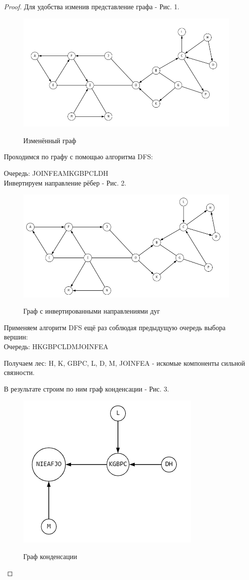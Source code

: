 \begin{proof}
 Для удобства изменив представление графа - Рис. 1.
 
    \begin{figure}[h]
    \centering
     \includegraphics[width=0.7\linewidth]{pics/8thGraphSol.png}
     \label{fig:dm}
     \caption{Изменённый граф}
    \end{figure}
 
 Проходимся по графу с помощью алгоритма DFS:
 
 Очередь: JOINFEAMKGBPCLDH\\

 Инвертируем направление рёбер - Рис. 2.

 \begin{figure}[h]
    \centering
     \includegraphics[width=0.7\linewidth]{pics/8thInverGraph.png}
     \label{fig:dm}
     \caption{Граф с инвертированными направлениями дуг}
    \end{figure}
 
 Применяем алгоритм DFS ещё раз соблюдая предыдущую очередь выбора вершин:\\
 
 Очередь: HKGBPCLDMJOINFEA

 Получаем лес: H, K, GBPC, L, D, M, JOINFEA - искомые компоненты сильной связности.
 
 В результате строим по ним граф конденсации - Рис. 3.

 \begin{figure}[h]
    \centering
     \includegraphics[width=0.3\linewidth]{pics/8thCondensGraph.png}
     \label{fig:dm}
     \caption{Граф конденсации}
    \end{figure}
\end{proof}

